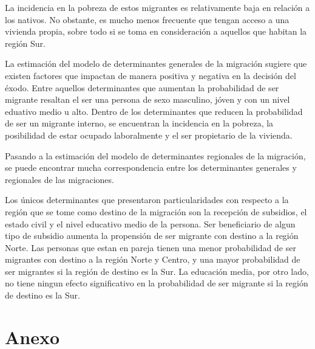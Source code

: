 \documentclass[12pt,a4paper]{article}
\begin{document}
La incidencia en la pobreza de estos migrantes es relativamente baja en relación a los nativos. No obstante, es mucho menos frecuente que tengan acceso a una vivienda propia, sobre todo si se toma en consideración a aquellos que habitan la región Sur.

La estimación del modelo de determinantes generales de la migración sugiere que existen factores que impactan de manera positiva y negativa en la decisión del éxodo.  Entre aquellos determinantes que aumentan la probabilidad de ser migrante resaltan el ser una persona de sexo masculino, jóven y con un nivel eduativo medio u alto. Dentro de los determinantes que reducen la probabilidad de ser un migrante interno, se encuentran la incidencia en la pobreza, la posibilidad de estar ocupado laboralmente y el ser propietario de la vivienda. 

Pasando a la estimación del modelo de determinantes regionales de la migración, se puede encontrar mucha correspondencia entre los determinantes generales y regionales de las migraciones.

Los únicos determinantes que presentaron particularidades con respecto a la región que se tome como destino de la migración son la recepción de subsidios, el estado civil y el nivel educativo medio de la persona. Ser beneficiario de algun tipo de subsidio aumenta la propensión de ser migrante con destino a la región Norte. Las personas que estan en pareja tienen una menor probabilidad de ser migrantes con destino a la región Norte y Centro, y una mayor probabilidad de ser migrantes si la región de destino es la Sur. La educación media, por otro lado, no tiene ningun efecto significativo en la probabilidad de ser migrante si la región de destino es la Sur.


\newpage
\printbibliography[title={Bibliografía}, heading=bibintoc]

\newpage
\section{Anexo}
\end{document}
